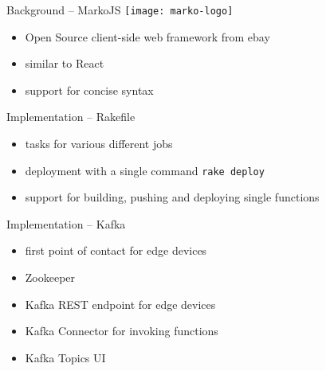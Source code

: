 \documentclass[aspectratio=169]{beamer}
\begin{document}
  \begin{frame}{Background -- MarkoJS}
    \texttt{[image: marko-logo]}

    \vspace*{2em}

    \begin{itemize}
      \item Open Source client-side web framework from ebay
      \item similar to React
      \item support for concise syntax
    \end{itemize}
  \end{frame}

  \begin{frame}{Implementation -- Rakefile}
    \begin{itemize}
      \item tasks for various different jobs
      \item deployment with a single command \lstinline{rake deploy}
      \item support for building, pushing and deploying single functions
    \end{itemize}
  \end{frame}

  \begin{frame}{Implementation -- Kafka}
    \begin{itemize}
      \item first point of contact for edge devices
      \item Zookeeper
      \item Kafka REST endpoint for edge devices
      \item Kafka Connector for invoking functions
      \item Kafka Topics UI
    \end{itemize}
  \end{frame}
\end{document}
